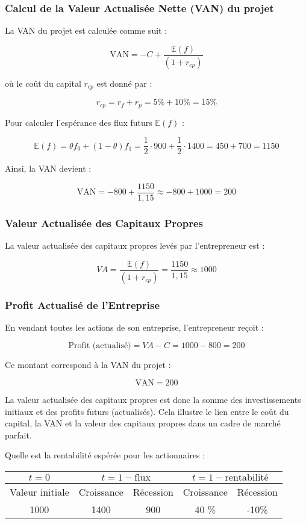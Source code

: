 \documentclass[a4paper, 12pt]{report}
\begin{document}
\subsubsection{Calcul de la Valeur Actualisée Nette (VAN) du projet}

La VAN du projet est calculée comme suit :

\[
\text{VAN} = -C + \frac{\mathbb{E}(f)}{(1 + r_{cp})}
\]

où le coût du capital \( r_{cp} \) est donné par :

\[
r_{cp} = r_f + r_p = 5\% + 10\% = 15\%
\]

Pour calculer l'espérance des flux futurs \( \mathbb{E}(f) \) :

\[
\mathbb{E}(f) = \theta f_0 + (1 - \theta) f_1 = \frac{1}{2} \cdot 900 + \frac{1}{2} \cdot 1400 = 450 + 700 = 1150
\]

Ainsi, la VAN devient :

\[
\text{VAN} = -800 + \frac{1150}{1,15} \approx -800 + 1000 = 200
\]

\subsubsection{Valeur Actualisée des Capitaux Propres}

La valeur actualisée des capitaux propres levés par l'entrepreneur est :

\[
VA = \frac{\mathbb{E}(f)}{(1 + r_{cp})} = \frac{1150}{1,15} \approx 1000
\]

\subsubsection{Profit Actualisé de l'Entreprise}

En vendant toutes les actions de son entreprise, l'entrepreneur reçoit :

\[
\text{Profit (actualisé)} = VA - C = 1000 - 800 = 200
\]

Ce montant correspond à la VAN du projet :

\[
\text{VAN} = 200
\]

La valeur actualisée des capitaux propres est donc la somme des investissements initiaux et des profits futurs (actualisés). Cela illustre le lien entre le coût du capital, la VAN et la valeur des capitaux propres dans un cadre de marché parfait.

Quelle est la rentabilité espérée pour les actionnaires :

\begin{center}
\begin{tabular}{@{}ccccc@{}}
	\toprule
	$t=0$           & \multicolumn{2}{c}{$t=1-\text{flux}$} & \multicolumn{2}{c}{$t=1-\text{rentabilité}$} \\ \midrule
	Valeur initiale & Croissance         & Récession        & Croissance            & Récession            \\
	1000            & 1400               & 900              & 40 \%                 & -10\%                \\ \bottomrule
\end{tabular}
\end{center}
\end{document}
